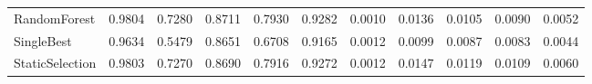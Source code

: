 \begin{table}[h!]
\begin{tabular}{l|l|l|l|l|l|l|l|l|l|l}
               RandomForest &    0.9804 &     0.7280 &  0.8711 &    0.7930 &   0.9282 &        0.0010 &         0.0136 &      0.0105 &        0.0090 &       0.0052 \\
                 SingleBest &    0.9634 &     0.5479 &  0.8651 &    0.6708 &   0.9165 &        0.0012 &         0.0099 &      0.0087 &        0.0083 &       0.0044 \\
            StaticSelection &    0.9803 &     0.7270 &  0.8690 &    0.7916 &   0.9272 &        0.0012 &         0.0147 &      0.0119 &        0.0109 &       0.0060 \\
\bottomrule
\end{tabular}

\end{table}
